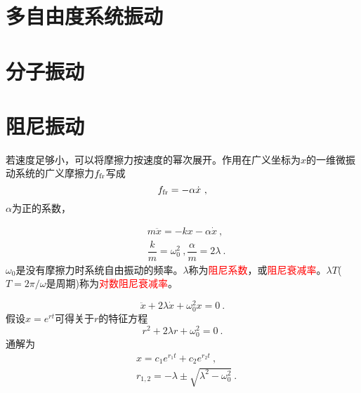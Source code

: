 \documentclass[11pt,a4paper]{article}
\begin{document}
\section{多自由度系统振动}
\cite{2007理论物理学教程} 






\section{分子振动}
\cite{2007理论物理学教程} 













\section{阻尼振动}
\cite{2007理论物理学教程} 



若速度足够小，可以将摩擦力按速度的幂次展开。作用在广义坐标为$x$的一维微振动系统的广义摩擦力$f_{\rm fr} $写成
\begin{equation}
f_{\rm fr} = -\alpha \dot{x} ~,
\end{equation}
$\alpha$为正的系数，

\begin{align}
& m \ddot{x} = -kx -\alpha \dot{x} ~, \\
& \dfrac{k}{m} = \omega_0^2 ~, \dfrac{\alpha}{m} = 2 \lambda ~.
\end{align}
$\omega_0$是没有摩擦力时系统自由振动的频率。$\lambda$称为\textcolor{red}{阻尼系数}，或\textcolor{red}{阻尼衰减率}。$\lambda T$($T = 2\pi/\omega$是周期)称为\textcolor{red}{对数阻尼衰减率}。

\begin{equation}
\ddot{x} + 2\lambda \dot{x} +\omega_0^2 x = 0 ~.
\end{equation}
假设$x = e^{rt}$可得关于$r$的特征方程
\begin{equation*}
r^2 +2\lambda r + \omega_0^2 = 0 ~.
\end{equation*}
通解为
\begin{align*}
& x = c_1 e^{r_1 t} +c_2 e^{r_2 t} ~, \\
& r_{1, 2} = -\lambda \pm \sqrt{\lambda^2 -\omega_0^2} ~.
\end{align*}
\end{document}
